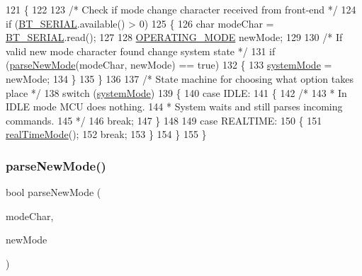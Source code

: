 \begin{DoxyCode}
121 \{
122 
123   \textcolor{comment}{/* Check if mode change character received from front-end */}
124   \textcolor{keywordflow}{if} (\hyperlink{logging-device_8ino_ad1e6e6f6fc813b305067b9e1b0777ea6}{BT\_SERIAL}.available() > 0)
125   \{
126     \textcolor{keywordtype}{char} modeChar = \hyperlink{logging-device_8ino_ad1e6e6f6fc813b305067b9e1b0777ea6}{BT\_SERIAL}.read();
127 
128     \hyperlink{logging-device_8ino_a980e950615d86dadef54f3cfaefb5fb4}{OPERATING\_MODE} newMode;
129 
130     \textcolor{comment}{/* If valid new mode character found change system state */}
131     \textcolor{keywordflow}{if} (\hyperlink{logging-device_8ino_aec1eb39e3cfde6331c4d29938c952c84}{parseNewMode}(modeChar, newMode) == \textcolor{keyword}{true})
132     \{
133       \hyperlink{logging-device_8ino_a13a2ecbcf455940dd240e54e9e39cf7a}{systemMode} = newMode;
134     \}
135   \}
136 
137   \textcolor{comment}{/* State machine for choosing what option takes place */}
138   \textcolor{keywordflow}{switch} (\hyperlink{logging-device_8ino_a13a2ecbcf455940dd240e54e9e39cf7a}{systemMode})
139   \{
140     \textcolor{keywordflow}{case} IDLE:
141     \{
142       \textcolor{comment}{/*}
143 \textcolor{comment}{       * In IDLE mode MCU does nothing.}
144 \textcolor{comment}{       * System waits and still parses incoming commands.}
145 \textcolor{comment}{       */}
146       \textcolor{keywordflow}{break};
147     \}
148 
149     \textcolor{keywordflow}{case} REALTIME:
150     \{
151       \hyperlink{logging-device_8ino_ab4c1c4c0fa047e336f9f4176406a54f1}{realTimeMode}();
152       \textcolor{keywordflow}{break};
153     \}
154   \}
155 \}
\end{DoxyCode}
\mbox{\label{logging-device_8ino_aec1eb39e3cfde6331c4d29938c952c84}} 
\subsubsection{\texorpdfstring{parse\+New\+Mode()}{parseNewMode()}}
{\footnotesize\ttfamily bool parse\+New\+Mode (\begin{DoxyParamCaption}\item[{char}]{mode\+Char,  }\item[{\hyperlink{logging-device_8ino_a980e950615d86dadef54f3cfaefb5fb4}{O\+P\+E\+R\+A\+T\+I\+N\+G\+\_\+\+M\+O\+DE} \&}]{new\+Mode }\end{DoxyParamCaption})}



